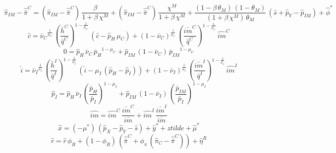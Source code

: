\begin{dmath}
{\hat{\pi}_{IM}}-{\hat{\bar{\pi}}^C}=\left({\hat{\pi}_{IM}}-{\hat{\bar{\pi}}^C}\right)\, \frac{{\beta}}{1+{\beta}\, {\chi^M}}+\left({\hat{\pi}_{IM}}-{\hat{\bar{\pi}}^C}\right)\, \frac{{\chi^M}}{1+{\beta}\, {\chi^M}}+\frac{\left(1-{\beta}\, {\theta_M}\right)\, \left(1-{\theta_M}\right)}{\left(1+{\beta}\, {\chi^M}\right)\, {\theta_M}}\, \left({\hat{s}}+{\hat{p}_Y}-{\hat{p}_{IM}}\right)+{\hat{\phi}^*}
\end{dmath}
\begin{dmath}
{\hat{c}}={\bar{\nu}_C}^{\frac{1}{{\mu_C}}}\, \left(\frac{{\bar{h}^C}}{{\bar{q}^C}}\right)^{1-\frac{1}{{\mu_C}}}\, \left({\hat{c}}-{\hat{p}_H}\, {\mu_C}\right)+\left(1-{\bar{\nu}_C}\right)^{\frac{1}{{\mu_C}}}\, \left(\frac{{\bar{im}^C}}{{\bar{q}^C}}\right)^{1-\frac{1}{{\mu_C}}}\, {\hat{im}^C}
\end{dmath}
\begin{dmath}
0={\hat{p}_H}\, {\bar{\nu}_C}\, {\bar{p}_H}^{1-{\mu_C}}+{\hat{p}_{IM}}\, \left(1-{\bar{\nu}_C}\right)\, {\bar{p}_{IM}}^{1-{\mu_C}}
\end{dmath}
\begin{dmath}
{\hat{i}}={\bar{\nu}_I}^{\frac{1}{{\mu_I}}}\, \left(\frac{{\bar{h}^I}}{{\bar{q}^I}}\right)^{1-\frac{1}{{\mu_I}}}\, \left({\hat{i}}-{\mu_I}\, \left({\hat{p}_H}-{\hat{p}_I}\right)\right)+\left(1-{\bar{\nu}_I}\right)^{\frac{1}{{\mu_I}}}\, \left(\frac{{\bar{im}^I}}{{\bar{q}^I}}\right)^{1-\frac{1}{{\mu_I}}}\, {\hat{im}^I}
\end{dmath}
\begin{dmath}
{\hat{p}_I}={\hat{p}_H}\, {\bar{\nu}_I}\, \left(\frac{{\bar{p}_H}}{{\bar{p}_I}}\right)^{1-{\mu_I}}+{\hat{p}_{IM}}\, \left(1-{\bar{\nu}_I}\right)\, \left(\frac{{\bar{p}_{IM}}}{{\bar{p}_I}}\right)^{1-{\mu_I}}
\end{dmath}
\begin{dmath}
{\hat{im}}={\hat{im}^C}\, \frac{{\bar{im}^C}}{{\bar{im}}}+{\hat{im}^I}\, \frac{{\bar{im}^I}}{{\bar{im}}}
\end{dmath}
\begin{dmath}
{\hat{x}}=\left(-{\mu^*}\right)\, \left({\hat{p}_X}-{\hat{p}_Y}-{\hat{s}}\right)+{\hat{y}^*}+{ztilde}+{\hat{\mu}^*}
\end{dmath}
\begin{dmath}
{\hat{r}}={\hat{r}}\, {\phi_R}+\left(1-{\phi_R}\right)\, \left({\hat{\bar{\pi}}^C}+{\phi_{\pi}}\, \left({\hat{\pi}_{C}}-{\hat{\bar{\pi}}^C}\right)\right)+{\hat{\eta}^{R}}
\end{dmath}
